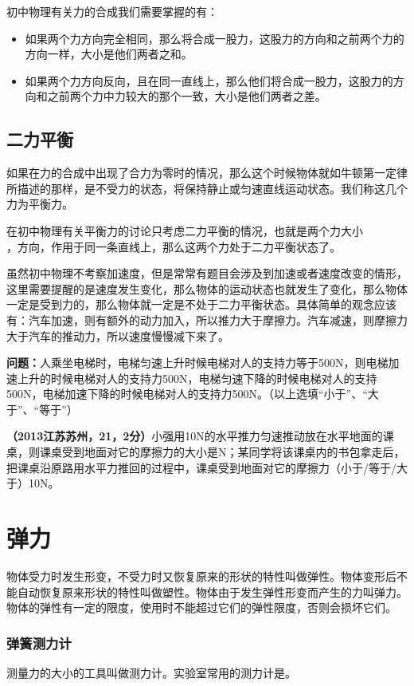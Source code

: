 \documentclass[12pt,twoside]{exam}
\begin{document}
\begin{knowledge}
初中物理有关力的合成我们需要掌握的有：
\begin{itemize}
\item 如果两个力方向完全相同，那么将合成一股力，这股力的方向和之前两个力的方向一样，大小是他们两者之和。
\item 如果两个力方向反向，且在同一直线上，那么他们将合成一股力，这股力的方向和之前两个力中力较大的那个一致，大小是他们两者之差。
\end{itemize}

\subsection{二力平衡}
如果在力的合成中出现了合力为零时的情况，那么这个时候物体就如牛顿第一定律所描述的那样，是不受力的状态，将保持静止或匀速直线运动状态。我们称这几个力为平衡力。

在初中物理有关平衡力的讨论只考虑二力平衡的情况，也就是两个力大小\\ \answerline*[相等]，方向\answerline*[相反]，作用于同一条直线上，那么这两个力处于二力平衡状态了。

虽然初中物理不考察加速度，但是常常有题目会涉及到加速或者速度改变的情形，这里需要提醒的是速度发生变化，那么物体的运动状态也就发生了变化，那么物体一定是受到力的，那么物体就一定是不处于二力平衡状态。具体简单的观念应该有：汽车加速，则有额外的动力加入，所以推力大于摩擦力。汽车减速，则摩擦力大于汽车的推动力，所以速度慢慢减下来了。

\textbf{问题：}人乘坐电梯时，电梯匀速上升时候电梯对人的支持力等于500N，则电梯加速上升的时候电梯对人的支持力\answerline*[大于]500N，电梯匀速下降的时候电梯对人的支持\answerline*[等于]500N，电梯加速下降的时候电梯对人的支持力\answerline*[小于]500N。（以上选填“小于”、“大于”、“等于”）

\textbf{（2013江苏苏州，21，2分）}小强用10N的水平推力匀速推动放在水平地面的课桌，则课桌受到地面对它的摩擦力的大小是\answerline*[10]N；某同学将该课桌内的书包拿走后，把课桌沿原路用水平力推回的过程中，课桌受到地面对它的摩擦力\answerline*[小于]（小于/等于/大于）10N。


\section{弹力}
物体受力时发生形变，不受力时又恢复原来的形状的特性叫做弹性。物体变形后不能自动恢复原来形状的特性叫做塑性。物体由于发生弹性形变而产生的力叫弹力。物体的弹性有一定的限度，使用时不能超过它们的弹性限度，否则会损坏它们。


\subsubsection{弹簧测力计}
测量力的大小的工具叫做测力计。实验室常用的测力计是。


\end{knowledge}
\end{document}
